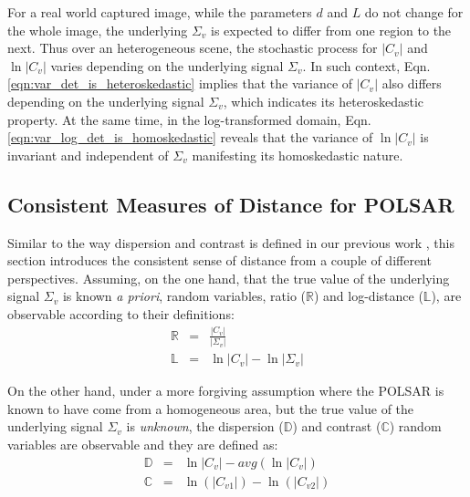 \documentclass[journal]{IEEEtran}
\begin{document}
For a real world captured image, while the parameters $d$ and $L$ do not change for the whole image,
  the underlying $\Sigma_v$ is expected to differ from one region to the next.
Thus over an heterogeneous scene, the stochastic process for $|C_v|$ and $\ln |C_v|$ varies depending on the underlying signal $\Sigma_v$. 
In such context, Eqn. \ref{eqn:var_det_is_heteroskedastic} implies that the variance of $|C_v|$ also differs depending on the underlying signal $\Sigma_v$, which indicates its heteroskedastic property.
At the same time, in the log-transformed domain, Eqn. \ref{eqn:var_log_det_is_homoskedastic} reveals that
  the variance of $\ln |C_v|$ is invariant and independent of $\Sigma_v$ manifesting its homoskedastic nature.

\subsection{Consistent Measures of Distance for POLSAR}
\label{sec:distance_measure}

Similar to the way dispersion and contrast is defined in our previous work \cite{Le_2010_ACRS} \cite{Le_2013_TGRS_SAR_MSE},
  this section introduces the consistent sense of distance from a couple of different perspectives.
Assuming, on the one hand, that the true value of the underlying signal $\Sigma_v$ is known \textit{a priori},
random variables,
  ratio ($\mathbb{R}$) and log-distance ($\mathbb{L}$),
  are observable according to their definitions:
\begin{eqnarray}
  \mathbb{R} &=& \frac{|C_v|}{|\Sigma_v|} \label{eqn:determinant_ratio_observables}\\
  \mathbb{L} &=& \ln|C_v| - \ln|\Sigma_v| \label{eqn:log_distance_observables} 
\end{eqnarray}

On the other hand, under a more forgiving assumption %
  where the POLSAR is known to have come from a homogeneous area, but the true value of the underlying signal $\Sigma_v$ is \textit{unknown},
  the dispersion ($\mathbb{D}$) and contrast ($\mathbb{C}$) random variables are observable and they are defined as:
\begin{eqnarray}
  \mathbb{D} &=& \ln{|C_v|} - avg(\ln{|C_v|}) \label{eqn:dispersion_observable}\\
  \mathbb{C} &=& \ln(|C_{v1}|) - \ln(|C_{v2}|) \label{eqn:contrast_observable}
\end{eqnarray}
\end{document}
